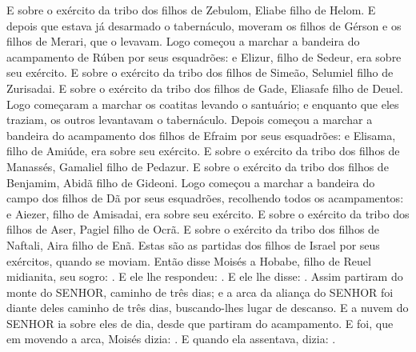 {  E sobre o exército da tribo dos filhos de Zebulom, Eliabe filho de Helom.
  E depois que estava já desarmado o tabernáculo, moveram os filhos de Gérson e os filhos de Merari, que o levavam.
  Logo começou a marchar a bandeira do acampamento de Rúben por seus esquadrões: e Elizur, filho de Sedeur, era sobre seu exército.
  E sobre o exército da tribo dos filhos de Simeão, Selumiel filho de Zurisadai.
  E sobre o exército da tribo dos filhos de Gade, Eliasafe filho de Deuel.
  Logo começaram a marchar os coatitas levando o santuário; e enquanto que eles traziam, os outros levantavam o tabernáculo.
  Depois começou a marchar a bandeira do acampamento dos filhos de Efraim por seus esquadrões: e Elisama, filho de Amiúde, era sobre seu exército.
  E sobre o exército da tribo dos filhos de Manassés, Gamaliel filho de Pedazur.
  E sobre o exército da tribo dos filhos de Benjamim, Abidã filho de Gideoni.
  Logo começou a marchar a bandeira do campo dos filhos de Dã por seus esquadrões, recolhendo todos os acampamentos: e Aiezer, filho de Amisadai, era sobre seu exército.
  E sobre o exército da tribo dos filhos de Aser, Pagiel filho de Ocrã.
  E sobre o exército da tribo dos filhos de Naftali, Aira filho de Enã.
  Estas são as partidas dos filhos de Israel por seus exércitos, quando se moviam.
  Então disse Moisés a Hobabe, filho de Reuel midianita, seu sogro: . %
  E ele lhe respondeu: .
  E ele lhe disse: .
  Assim partiram do monte do SENHOR, caminho de três dias; e a arca da aliança do SENHOR foi diante deles caminho de três dias, buscando-lhes lugar de descanso.
  E a nuvem do SENHOR ia sobre eles de dia, desde que partiram do acampamento.
  E foi, que em movendo a arca, Moisés dizia: .
  E quando ela assentava, dizia: .
\par }

